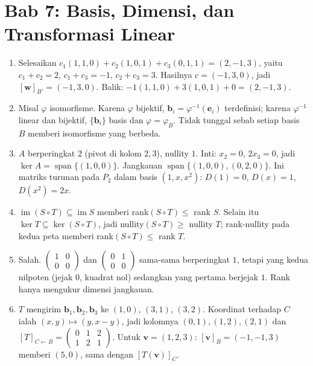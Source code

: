 \section*{Bab 7: Basis, Dimensi, dan Transformasi Linear}
\begin{enumerate}[label=\textbf{7.\arabic*}]
  \item Selesaikan $c_{1}(1,1,0)+c_{2}(1,0,1)+c_{3}(0,1,1)=(2,-1,3)$, yaitu
        $c_{1}+c_{2}=2$, $c_{1}+c_{3}=-1$, $c_{2}+c_{3}=3$. Hasilnya
        $c=(-1,3,0)$, jadi $[\mathbf{w}]_{B'}=(-1,3,0)$. Balik:
        $-1(1,1,0)+3(1,0,1)+0=(2,-1,3)$.

  \item Misal $\varphi$ isomorfisme. Karena $\varphi$ bijektif,
        $\mathbf{b}_{i}=\varphi^{-1}(\mathbf{e}_{i})$ terdefinisi; karena
        $\varphi^{-1}$ linear dan bijektif, $\{\mathbf{b}_{i}\}$ basis dan
        $\varphi=\varphi_{B}$. Tidak tunggal sebab setiap basis $B$ memberi
        isomorfisme yang berbeda.

  \item $A$ berperingkat $2$ (pivot di kolom $2,3$), nullity $1$. Inti:
        $x_{2}=0$, $2x_{3}=0$, jadi $\ker A=\operatorname{span}\{(1,0,0)\}$.
        Jangkauan $\operatorname{span}\{(1,0,0),(0,2,0)\}$. Ini matriks turunan
        pada $P_{2}$ dalam basis $(1,x,x^{2})$: $D(1)=0$, $D(x)=1$,
        $D(x^{2})=2x$.

  \item $\operatorname{im}(S\circ T)\subseteq\operatorname{im}S$ memberi
        rank$(S\circ T)\le$ rank $S$. Selain itu
        $\ker T\subseteq\ker(S\circ T)$, jadi nullity$(S\circ T)\ge$ nullity $T$;
        rank-nullity pada kedua peta memberi rank$(S\circ T)\le$ rank $T$.

  \item Salah. $\begin{pmatrix}1&0\\0&0\end{pmatrix}$ dan
        $\begin{pmatrix}0&1\\0&0\end{pmatrix}$ sama-sama berperingkat $1$, tetapi
        yang kedua nilpoten (jejak $0$, kuadrat nol) sedangkan yang pertama
        berjejak $1$. Rank hanya mengukur dimensi jangkauan.

  \item $T$ mengirim $\mathbf{b}_{1},\mathbf{b}_{2},\mathbf{b}_{3}$ ke $(1,0)$,
        $(3,1)$, $(3,2)$. Koordinat terhadap $C$ ialah $(x,y)\mapsto(y,x-y)$,
        jadi kolomnya $(0,1),(1,2),(2,1)$ dan
        $[T]_{C\leftarrow B}=\begin{pmatrix}0&1&2\\1&2&1\end{pmatrix}$.
        Untuk $\mathbf{v}=(1,2,3)$: $[\mathbf{v}]_{B}=(-1,-1,3)$ memberi
        $(5,0)$, sama dengan $[T(\mathbf{v})]_{C}$.


\end{enumerate}
